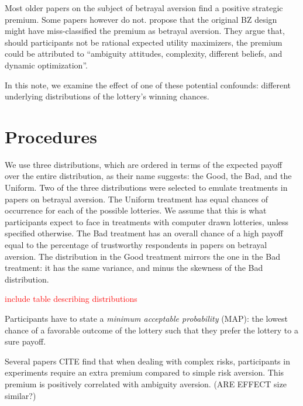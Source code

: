 Most older papers on the subject of betrayal aversion find a positive strategic premium.
Some papers however do not.
\cite{Li2020} propose that the original BZ design might have miss-classified the premium as betrayal aversion.
They argue that, should participants not be rational expected utility maximizers, the premium could be attributed to ``ambiguity attitudes, complexity, different beliefs, and dynamic optimization''.

In this note, we examine the effect of one of these potential confounds: different underlying distributions of the lottery's winning chances.

\section{Procedures}\label{sec:proced}
We use three distributions, which are ordered in terms of the expected payoff over the entire distribution, as their name suggests: the Good, the Bad, and the Uniform.
Two of the three distributions were selected to emulate treatments in papers on betrayal aversion.
The Uniform treatment has equal chances of occurrence for each of the possible lotteries.
We assume that this is what participants expect to face in treatments with computer drawn lotteries, unless specified otherwise.
The Bad treatment has an overall chance of a high payoff equal to the percentage of trustworthy respondents in papers on betrayal aversion.
The distribution in the Good treatment mirrors the one in the Bad treatment: it has the same variance, and minus the skewness of the Bad distribution.

\textcolor{red}{include table describing distributions}

Participants have to state a \textit{minimum acceptable probability} (MAP): the lowest chance of a favorable outcome of the lottery such that they prefer the lottery to a sure payoff.

Several papers CITE find that when dealing with complex risks, participants in experiments require an extra premium compared to simple risk aversion.
This premium is positively correlated with ambiguity aversion. (ARE EFFECT size similar?)




